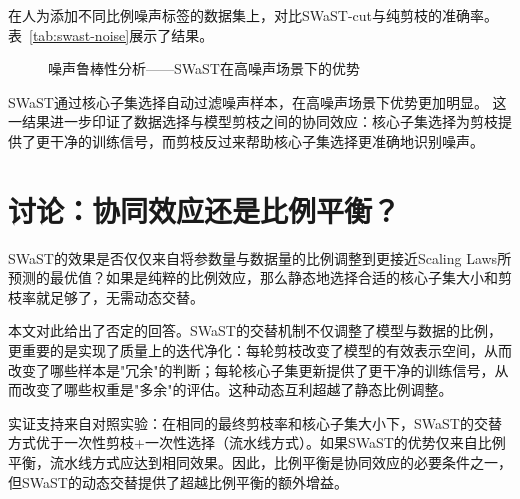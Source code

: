 在人为添加不同比例噪声标签的数据集上，对比SWaST-cut与纯剪枝的准确率。表~\ref{tab:swast-noise}展示了结果。

\begin{table}[htb]
  \centering
  \caption{不同噪声比例下CIFAR-10上各方法的准确率对比}
  \label{tab:swast-noise}
\end{table}

\begin{figure}[htb]
  \centering
  \caption{噪声鲁棒性分析——SWaST在高噪声场景下的优势}
  \label{fig:swast-noise}
\end{figure}

SWaST通过核心子集选择自动过滤噪声样本，在高噪声场景下优势更加明显。%
这一结果进一步印证了数据选择与模型剪枝之间的协同效应：核心子集选择为剪枝提供了更干净的训练信号，而剪枝反过来帮助核心子集选择更准确地识别噪声。


\section{讨论：协同效应还是比例平衡？}

SWaST的效果是否仅仅来自将参数量与数据量的比例调整到更接近Scaling Laws\cite{kaplan2020scaling, hoffmann2022training}所预测的最优值？如果是纯粹的比例效应，那么静态地选择合适的核心子集大小和剪枝率就足够了，无需动态交替。

本文对此给出了否定的回答。SWaST的交替机制不仅调整了模型与数据的比例，更重要的是实现了质量上的迭代净化：每轮剪枝改变了模型的有效表示空间，从而改变了哪些样本是"冗余"的判断；每轮核心子集更新提供了更干净的训练信号，从而改变了哪些权重是"多余"的评估。这种动态互利超越了静态比例调整。

实证支持来自对照实验：在相同的最终剪枝率和核心子集大小下，SWaST的交替方式优于一次性剪枝+一次性选择（流水线方式）。如果SWaST的优势仅来自比例平衡，流水线方式应达到相同效果。因此，比例平衡是协同效应的必要条件之一，但SWaST的动态交替提供了超越比例平衡的额外增益。


